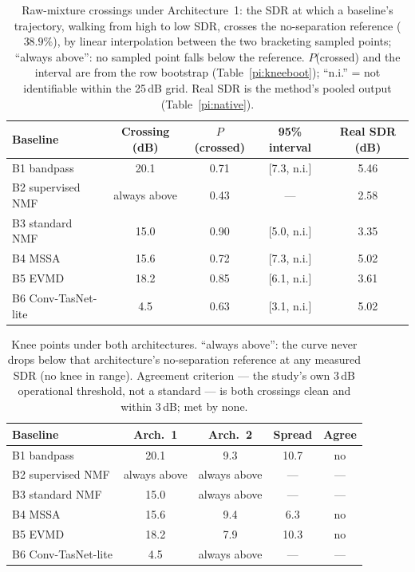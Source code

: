 \documentclass[conference]{IEEEtran}
\begin{document}
\begin{table}[htbp]
\centering
\caption{Raw-mixture crossings under Architecture~1: the SDR at which a baseline's trajectory, walking from high to low SDR, crosses the no-separation reference ($38.9\%$), by linear interpolation between the two bracketing sampled points; ``always above'': no sampled point falls below the reference. $P$(crossed) and the interval are from the row bootstrap (Table~\ref{pi:kneeboot}); ``n.i.'' = not identifiable within the 25\,dB grid. Real SDR is the method's pooled output (Table~\ref{pi:native}).}
\label{pi:knee1}
\footnotesize\setlength{\tabcolsep}{3.5pt}
\begin{tabular}{@{}lcccc@{}}
\toprule
Baseline & Crossing (dB) & $P$(crossed) & 95\% interval & Real SDR (dB) \\
\midrule
B1 bandpass        & 20.1 & 0.71 & [7.3, n.i.] & 5.46 \\
B2 supervised NMF  & always above & 0.43 & --- & 2.58 \\
B3 standard NMF    & 15.0 & 0.90 & [5.0, n.i.] & 3.35 \\
B4 MSSA            & 15.6 & 0.72 & [7.3, n.i.] & 5.02 \\
B5 EVMD            & 18.2 & 0.85 & [6.1, n.i.] & 3.61 \\
B6 Conv-TasNet-lite & 4.5 & 0.63 & [3.1, n.i.] & 5.02 \\
\bottomrule
\end{tabular}
\end{table}

\begin{table}[htbp]
\centering
\caption{Knee points under both architectures. ``always above'': the curve never drops below that architecture's no-separation reference at any measured SDR (no knee in range). Agreement criterion --- the study's own 3\,dB operational threshold, not a standard --- is both crossings clean and within 3\,dB; met by none.}
\label{pi:knee2}
\footnotesize\setlength{\tabcolsep}{3.5pt}
\begin{tabular}{@{}lcccc@{}}
\toprule
Baseline & Arch.\ 1 & Arch.\ 2 & Spread & Agree \\
\midrule
B1 bandpass        & 20.1 & 9.3 & 10.7 & no \\
B2 supervised NMF  & always above & always above & --- & --- \\
B3 standard NMF    & 15.0 & always above & --- & --- \\
B4 MSSA            & 15.6 & 9.4 & 6.3 & no \\
B5 EVMD            & 18.2 & 7.9 & 10.3 & no \\
B6 Conv-TasNet-lite & 4.5 & always above & --- & --- \\
\bottomrule
\end{tabular}
\end{table}
\end{document}
